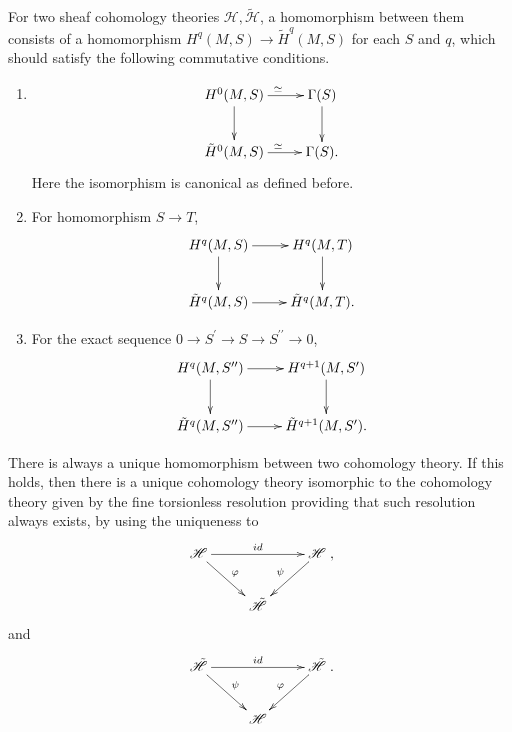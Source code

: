 \documentclass[twoside]{article}
\begin{document}
\begin{definition}
  For two sheaf cohomology theories $\mathscr{H},\tilde{\mathscr{H}}$, a homomorphism between them consists of a homomorphism $H^q(M,S)\to \tilde{H}^q(M,S)$ for each $S$ and $q$, which should satisfy the following commutative conditions.

  \begin{enumerate}
    \item  \begin{equation*}
      \xymatrix{
      H^0(M,S)\ar[d]\ar[r]^\simeq&\Gamma(S)\ar[d]\\
      \tilde{H}^0(M,S)\ar[r]^\simeq&\Gamma(S).\\
      }
    \end{equation*}
    Here the isomorphism is canonical   as defined before.
    \item For homomorphism $S\to T$, \begin{equation*}
      \xymatrix{
      H^q(M,S)\ar[d]\ar[r]&H^q(M,T)\ar[d]\\
      \tilde{H}^q(M,S)\ar[r]&\tilde{H}^q(M,T).\\
      }
    \end{equation*}
    \item For the exact sequence  $0\to S^\prime\to S\to S^{\prime\prime}\to 0$,\begin{equation*}
      \xymatrix{
      H^q(M,S^{\prime\prime})\ar[d]\ar[r]&H^{q+1}(M,S^\prime)\ar[d]\\
      \tilde{H}^q(M,S^{\prime\prime})\ar[r]&\tilde{H}^{q+1}(M,S^\prime).\\
      }
    \end{equation*}
  \end{enumerate}

\end{definition}


There is always a unique homomorphism between two cohomology theory. If this holds, then there is a unique cohomology theory isomorphic to the cohomology theory given by the fine torsionless resolution providing that such resolution always exists, by using the uniqueness to
\begin{equation*}
  \xymatrix{\mathscr{H}\ar[dr]^{\varphi}\ar[rr]^{id}&&\mathscr{H}\ar[dl]_{\psi}\\
  &\tilde{\mathscr{H}}&\\
},\end{equation*}
and \begin{equation*}
  \xymatrix{\tilde{\mathscr{H}}\ar[dr]^{\psi}\ar[rr]^{id}&&\tilde{\mathscr{H}}\ar[dl]_{\varphi}\\
  &\mathscr{H}&\\}.
\end{equation*}
\end{document}
